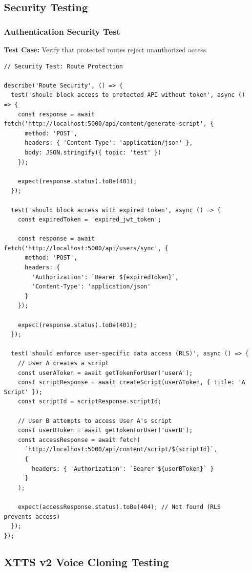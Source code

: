 \subsection{Security Testing}

\subsubsection{Authentication Security Test}

\textbf{Test Case:} Verify that protected routes reject unauthorized access.

\begin{verbatim}
// Security Test: Route Protection

describe('Route Security', () => {
  test('should block access to protected API without token', async () => {
    const response = await fetch('http://localhost:5000/api/content/generate-script', {
      method: 'POST',
      headers: { 'Content-Type': 'application/json' },
      body: JSON.stringify({ topic: 'test' })
    });
    
    expect(response.status).toBe(401);
  });

  test('should block access with expired token', async () => {
    const expiredToken = 'expired_jwt_token';
    
    const response = await fetch('http://localhost:5000/api/users/sync', {
      method: 'POST',
      headers: {
        'Authorization': `Bearer ${expiredToken}`,
        'Content-Type': 'application/json'
      }
    });
    
    expect(response.status).toBe(401);
  });

  test('should enforce user-specific data access (RLS)', async () => {
    // User A creates a script
    const userAToken = await getTokenForUser('userA');
    const scriptResponse = await createScript(userAToken, { title: 'A Script' });
    const scriptId = scriptResponse.scriptId;
    
    // User B attempts to access User A's script
    const userBToken = await getTokenForUser('userB');
    const accessResponse = await fetch(
      `http://localhost:5000/api/content/script/${scriptId}`,
      {
        headers: { 'Authorization': `Bearer ${userBToken}` }
      }
    );
    
    expect(accessResponse.status).toBe(404); // Not found (RLS prevents access)
  });
});
\end{verbatim}

\subsection{XTTS v2 Voice Cloning Testing}

